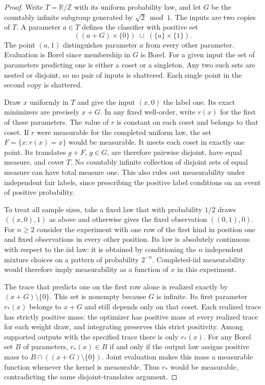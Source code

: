 \documentclass[11pt]{article}
\theoremstyle{definition}\newtheorem{definition}[theorem]{Definition}
\begin{document}
\begin{proof}
Write $T=\mathbb R/\mathbb Z$ with its uniform probability law, and let
$G$ be the countably infinite subgroup generated by $\sqrt{2}\bmod 1$.
The inputs are two copies of $T$. A parameter $a\in T$ defines the classifier
with positive set
\[
 ((a+G)\times\{0\})\;\cup\; (\{a\}\times\{1\}).
\]
The point $(a,1)$ distinguishes parameter $a$ from every other parameter.
Evaluation is Borel since membership in $G$ is Borel. For a given input
the set of parameters predicting one is either a coset or a singleton.
Any two such sets are nested or disjoint, so no pair of inputs is
shattered. Each single point in the second copy is shattered.

Draw $x$ uniformly in $T$ and give the input $(x,0)$ the label one.
Its exact minimizers are precisely $x+G$. In any fixed well-order, write
$r(x)$ for the first of these parameters. The value of $r$ is constant
on each coset and belongs to that coset. If $r$ were measurable for the
completed uniform law, the set $F=\{x:r(x)=x\}$ would be measurable.
It meets each coset in exactly one point. Its translates $g+F$, $g\in G$,
are therefore pairwise disjoint, have equal measure, and cover $T$.
No countably infinite collection of disjoint sets of equal measure can
have total measure one. This also rules out measurability under independent
fair labels, since prescribing the positive label conditions on an event
of positive probability.

To treat all sample sizes, take a fixed law that with probability $1/2$
draws $((x,0),1)$ as above and otherwise gives the fixed observation
$((0,1),0)$. For $n\ge2$ consider the experiment with one row of the first
kind in position one and fixed observations in every other position. Its
law is absolutely continuous with respect to the iid law: it is obtained
by conditioning the $n$ independent mixture choices on a pattern of
probability $2^{-n}$. Completed-iid measurability would therefore imply
measurability as a function of $x$ in this experiment.

The trace that predicts one on the first row alone is realized exactly by
$(x+G)\setminus\{0\}$. This set is nonempty because $G$ is infinite.
Its first parameter $r_*(x)$ belongs to $x+G$ and still depends only on that
coset. Each realized trace has strictly positive mass: the optimizer has
positive mass at every realized trace for each weight draw, and integrating
preserves this strict positivity. Among supported outputs with the specified
trace there is only $r_*(x)$. For any Borel set $B$ of parameters,
$r_*(x)\in B$ if and only if the output law assigns positive mass to
$B\cap ((x+G)\setminus\{0\})$. Joint evaluation makes this mass a measurable
function whenever the kernel is measurable. Thus $r_*$ would be measurable,
contradicting the same disjoint-translates argument.
\end{proof}
\end{document}
